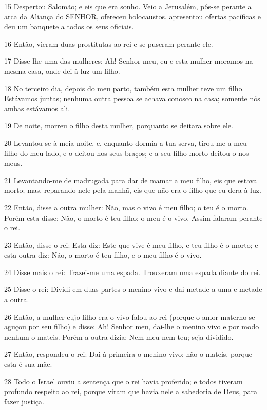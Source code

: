 \par 15 Despertou Salomão; e eis que era sonho. Veio a Jerusalém, pôs-se perante a arca da Aliança do SENHOR, ofereceu holocaustos, apresentou ofertas pacíficas e deu um banquete a todos os seus oficiais.
\par 16 Então, vieram duas prostitutas ao rei e se puseram perante ele.
\par 17 Disse-lhe uma das mulheres: Ah! Senhor meu, eu e esta mulher moramos na mesma casa, onde dei à luz um filho.
\par 18 No terceiro dia, depois do meu parto, também esta mulher teve um filho. Estávamos juntas; nenhuma outra pessoa se achava conosco na casa; somente nós ambas estávamos ali.
\par 19 De noite, morreu o filho desta mulher, porquanto se deitara sobre ele.
\par 20 Levantou-se à meia-noite, e, enquanto dormia a tua serva, tirou-me a meu filho do meu lado, e o deitou nos seus braços; e a seu filho morto deitou-o nos meus.
\par 21 Levantando-me de madrugada para dar de mamar a meu filho, eis que estava morto; mas, reparando nele pela manhã, eis que não era o filho que eu dera à luz.
\par 22 Então, disse a outra mulher: Não, mas o vivo é meu filho; o teu é o morto. Porém esta disse: Não, o morto é teu filho; o meu é o vivo. Assim falaram perante o rei.
\par 23 Então, disse o rei: Esta diz: Este que vive é meu filho, e teu filho é o morto; e esta outra diz: Não, o morto é teu filho, e o meu filho é o vivo.
\par 24 Disse mais o rei: Trazei-me uma espada. Trouxeram uma espada diante do rei.
\par 25 Disse o rei: Dividi em duas partes o menino vivo e dai metade a uma e metade a outra.
\par 26 Então, a mulher cujo filho era o vivo falou ao rei (porque o amor materno se aguçou por seu filho) e disse: Ah! Senhor meu, dai-lhe o menino vivo e por modo nenhum o mateis. Porém a outra dizia: Nem meu nem teu; seja dividido.
\par 27 Então, respondeu o rei: Dai à primeira o menino vivo; não o mateis, porque esta é sua mãe.
\par 28 Todo o Israel ouviu a sentença que o rei havia proferido; e todos tiveram profundo respeito ao rei, porque viram que havia nele a sabedoria de Deus, para fazer justiça.

